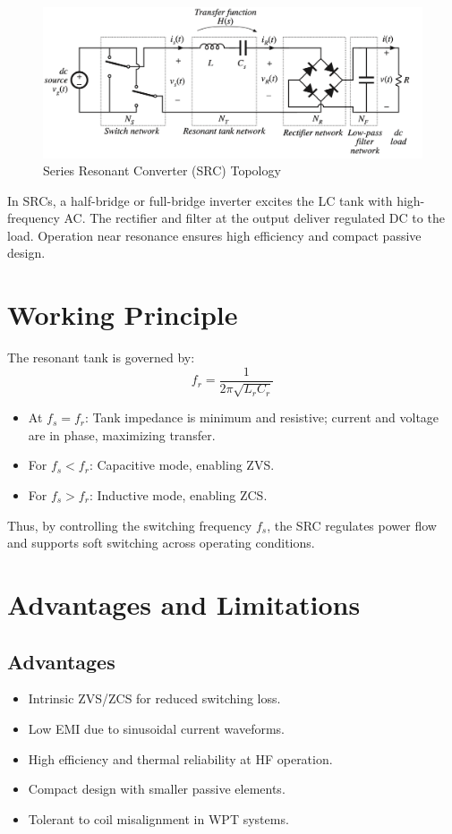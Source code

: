 \documentclass[12pt,a4paper]{report}
\begin{document}
\begin{figure}[H]
    \centering
    \includegraphics[width=0.7\linewidth]{788.png}
    \caption{Series Resonant Converter (SRC) Topology}
\end{figure}

 In SRCs, a half-bridge or full-bridge inverter excites the LC tank with high-frequency AC. The rectifier and filter at the output deliver regulated DC to the load. Operation near resonance ensures high efficiency and compact passive design.

\section{Working Principle}
The resonant tank is governed by:
\[
f_r = \frac{1}{2\pi \sqrt{L_r C_r}}
\]

\begin{itemize}
    \item At \(f_s = f_r\): Tank impedance is minimum and resistive; current and voltage are in phase, maximizing transfer.
    \item For \(f_s < f_r\): Capacitive mode, enabling ZVS.
    \item For \(f_s > f_r\): Inductive mode, enabling ZCS.
\end{itemize}

Thus, by controlling the switching frequency \(f_s\), the SRC regulates power flow and supports soft switching across operating conditions.\cite{li2022singleended}

\section{Advantages and Limitations}

\subsection*{Advantages}
\begin{itemize}
    \item Intrinsic ZVS/ZCS for reduced switching loss.
    \item Low EMI due to sinusoidal current waveforms.
    \item High efficiency and thermal reliability at HF operation.
    \item Compact design with smaller passive elements.
    \item Tolerant to coil misalignment in WPT systems.\cite{irivennela2020wireless}\cite{li2022singleended}\cite{lin2021analysis}\cite{erickson2020resonant}
    
\end{itemize}
\end{document}
